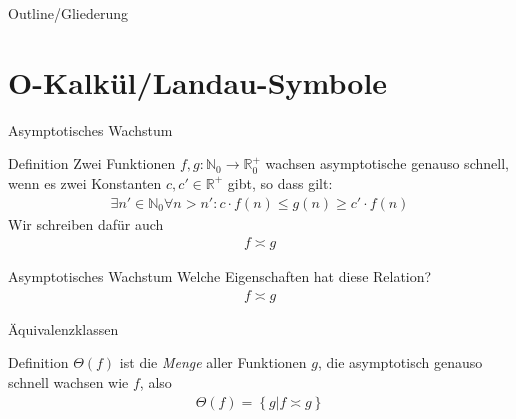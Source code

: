 
\subtitle{Foliensatz 8}
\date{13. Dezember 2012}



\begin{frame}
    \titlepage
\end{frame}

\begin{frame}{Outline/Gliederung}
    \tableofcontents
\end{frame}

\section{O-Kalkül/Landau-Symbole}
\begin{frame}{Asymptotisches Wachstum}
    \begin{block}{Definition}
        Zwei Funktionen $f,g: \mathbb{N}_0 \rightarrow \mathbb{R}_0^+$ wachsen asymptotische genauso schnell, wenn es zwei Konstanten $c, c' \in \mathbb{R}^+$ gibt, so dass gilt:
        \begin{align*}
            \exists n' \in\mathbb{N}_0 \forall n > n': c\cdot f\left( n \right) \leq g\left( n \right) \geq c'\cdot f\left( n \right)
        \end{align*}
        Wir schreiben dafür auch
        \begin{align*}
            f\asymp g
        \end{align*}
    \end{block}
\end{frame}
\begin{frame}{Asymptotisches Wachstum}
    Welche Eigenschaften hat diese Relation?
    \begin{align*}
        f \asymp g
    \end{align*}
\end{frame}
\begin{frame}{Äquivalenzklassen}
    \begin{block}{Definition}
        $\Theta\left( f \right)$ ist die \emph{Menge} aller Funktionen $g$, die asymptotisch genauso schnell wachsen wie $f$, also
        \begin{align*}
            \Theta\left( f \right) = \left\{ g | f\asymp g \right\}
        \end{align*}
    \end{block}
\end{frame}
